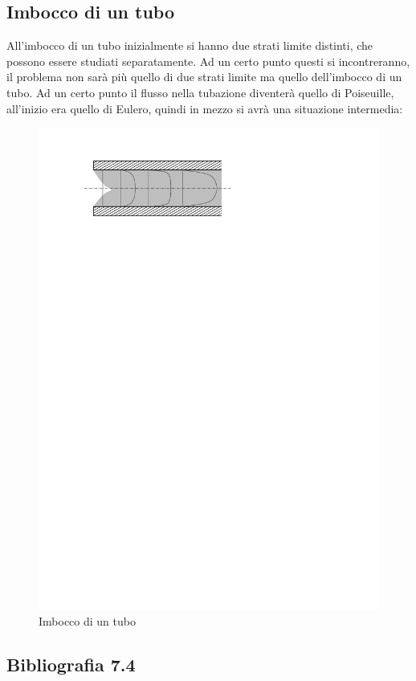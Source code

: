 \subsection{Imbocco di un tubo}
All'imbocco di un tubo inizialmente si hanno due strati limite distinti, che possono essere studiati separatamente.
Ad un certo punto questi si incontreranno, il problema non sarà più quello di due strati limite ma quello dell'imbocco di un tubo.
Ad un certo punto il flusso nella tubazione diventerà quello di Poiseuille, all'inizio era quello di Eulero, quindi in mezzo si avrà una situazione intermedia:
	\begin{figure}[ht]
		\includegraphics[scale=1.0]{./7.4 Strato limite/7.4-9}
		\centering
		\caption{Imbocco di un tubo}
	\end{figure}
%


\subsection*{Bibliografia 7.4}
\cite[Cap.\ 10.5]{CengelCimbala}\\
\cite[Cap.\ 11.1, 11.2]{PnueliGutfinger}